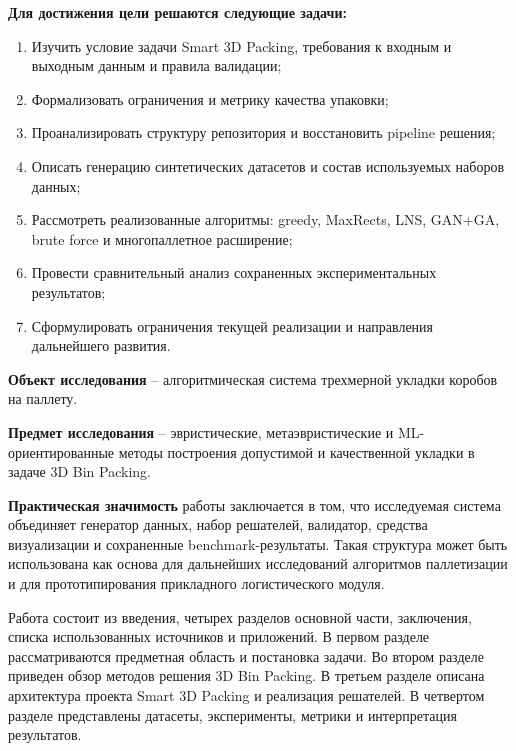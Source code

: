 \textbf{Для достижения цели решаются следующие задачи:}
\begin{enumerate}
  \item Изучить условие задачи Smart 3D Packing, требования к входным и выходным данным и правила валидации;
  \item Формализовать ограничения и метрику качества упаковки;
  \item Проанализировать структуру репозитория и восстановить pipeline решения;
  \item Описать генерацию синтетических датасетов и состав используемых наборов данных;
  \item Рассмотреть реализованные алгоритмы: greedy, MaxRects, LNS, GAN+GA, brute force и многопаллетное расширение;
  \item Провести сравнительный анализ сохраненных экспериментальных результатов;
  \item Сформулировать ограничения текущей реализации и направления дальнейшего развития.
\end{enumerate}

\textbf{Объект исследования} -- алгоритмическая система трехмерной укладки коробов на паллету.

\textbf{Предмет исследования} -- эвристические, метаэвристические и ML-ориентированные методы построения допустимой и качественной укладки в задаче 3D Bin Packing.

\textbf{Практическая значимость} работы заключается в том, что исследуемая система объединяет генератор данных, набор решателей, валидатор, средства визуализации и сохраненные benchmark-результаты. Такая структура может быть использована как основа для дальнейших исследований алгоритмов паллетизации и для прототипирования прикладного логистического модуля.

Работа состоит из введения, четырех разделов основной части, заключения, списка использованных источников и приложений. В первом разделе рассматриваются предметная область и постановка задачи. Во втором разделе приведен обзор методов решения 3D Bin Packing. В третьем разделе описана архитектура проекта Smart 3D Packing и реализация решателей. В четвертом разделе представлены датасеты, эксперименты, метрики и интерпретация результатов.
